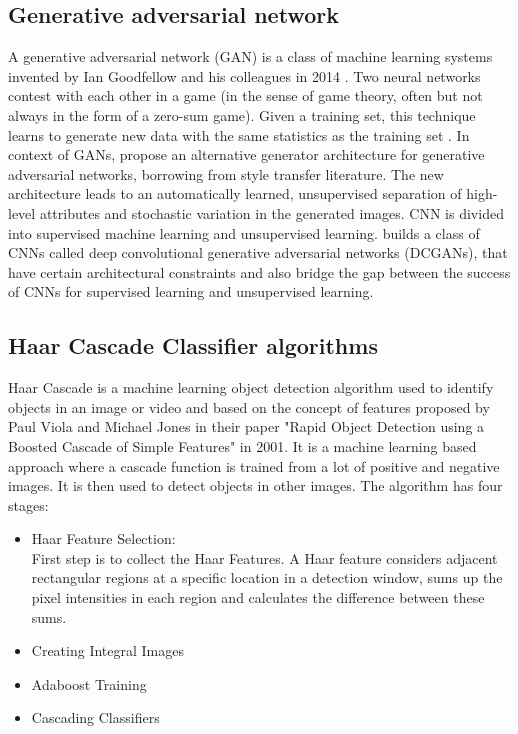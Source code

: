 \documentclass[conference]{IEEEtran}
\begin{document}
\subsection{Generative adversarial network}
A generative adversarial network (GAN) is a class of machine learning systems invented by Ian Goodfellow and his colleagues in 2014 \cite{b12}. Two neural networks contest with each other in a game (in the sense of game theory, often but not always in the form of a zero-sum game). Given a training set, this technique learns to generate new data with the same statistics as the training set \cite{b13}. In context of GANs, \cite{b14} propose an alternative generator architecture for generative adversarial networks, borrowing from style transfer literature. The new architecture leads to an automatically learned, unsupervised separation of high-level attributes and stochastic variation in the generated images. CNN is divided into supervised machine learning and unsupervised learning. \cite{b15} builds a class of CNNs called deep convolutional generative adversarial networks (DCGANs), that have certain architectural constraints and also bridge the gap between the success of CNNs for supervised learning and unsupervised learning.

\subsection{Haar Cascade Classifier algorithms}
  Haar Cascade is a machine learning object detection algorithm used to identify objects in an image or video and based on the concept of  features proposed by Paul Viola and Michael Jones in their paper "Rapid Object Detection using a Boosted Cascade of Simple Features" in 2001.
It is a machine learning based approach where a cascade function is trained from a lot of positive and negative images. It is then used to detect objects in other images.\cite{b16}
The algorithm has four stages:
\begin{itemize}
\item
	Haar Feature Selection: 
\\First step is to collect the Haar Features.  A Haar feature considers adjacent rectangular regions at a specific location in a detection window, sums up the pixel intensities in each region and calculates the difference between these sums.  
\item
    Creating  Integral Images
\item
    Adaboost Training
\item
    Cascading Classifiers
\end{itemize}
\end{document}
